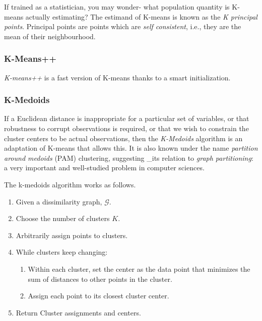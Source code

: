 \documentclass[]{book}
\providecommand{\tightlist}{%
  \setlength{\itemsep}{0pt}\setlength{\parskip}{0pt}}
\theoremstyle{definition}
\theoremstyle{definition}
\theoremstyle{definition}
\theoremstyle{remark}
\let\BeginKnitrBlock\begin \let\EndKnitrBlock\end
\begin{document}
\bigskip

\BeginKnitrBlock{remark}
{}If trained as a statistician, you may wonder- what population quantity is K-means actually estimating?
The estimand of K-means is known as the \emph{K principal points}.
Principal points are points which are \emph{self consistent}, i.e., they are the mean of their neighbourhood.
\EndKnitrBlock{remark}

\hypertarget{k-means-1}{%
\subsubsection{K-Means++}\label{k-means-1}}

\emph{K-means++} is a fast version of K-means thanks to a smart initialization.

\hypertarget{k-medoids}{%
\subsubsection{K-Medoids}\label{k-medoids}}

If a Euclidean distance is inappropriate for a particular set of variables, or that robustness to corrupt observations is required, or that we wish to constrain the cluster centers to be actual observations, then the \emph{K-Medoids} algorithm is an adaptation of K-means that allows this.
It is also known under the name \emph{partition around medoids} (PAM) clustering, suggesting \_its relation to \emph{graph partitioning}: a very important and well-studied problem in computer sciences.

The k-medoids algorithm works as follows.

\begin{enumerate}
\def\labelenumi{\arabic{enumi}.}
\tightlist
\item
  Given a dissimilarity graph, \(\mathcal{G}\).
\item
  Choose the number of clusters \(K\).
\item
  Arbitrarily assign points to clusters.
\item
  While clusters keep changing:

  \begin{enumerate}
  \def\labelenumii{\arabic{enumii}.}
  \tightlist
  \item
    Within each cluster, set the center as the data point that minimizes the sum of distances to other points in the cluster.
  \item
    Assign each point to its closest cluster center.
  \end{enumerate}
\item
  Return Cluster assignments and centers.
\end{enumerate}
\end{document}
